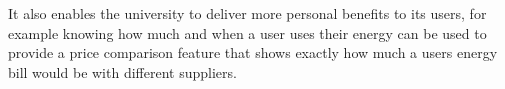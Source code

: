 \documentclass[11pt,a4paper,twoside]{article}
\begin{document}
It also enables the university to deliver more personal benefits to its users, for example knowing how much and when a user uses their energy can be used to provide a price comparison feature that shows exactly how much a users energy bill would be with different suppliers.

\newpage

\renewcommand{\bibname}{References} %
\end{document}
